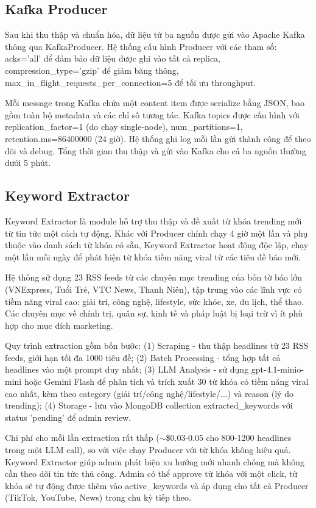 \subsection{Kafka Producer}

Sau khi thu thập và chuẩn hóa, dữ liệu từ ba nguồn được gửi vào Apache Kafka thông qua KafkaProducer. Hệ thống cấu hình Producer với các tham số: acks='all' để đảm bảo dữ liệu được ghi vào tất cả replica, compression\_type='gzip' để giảm băng thông, max\_in\_flight\_requests\_per\_connection=5 để tối ưu throughput.

Mỗi message trong Kafka chứa một content item được serialize bằng JSON, bao gồm toàn bộ metadata và các chỉ số tương tác. Kafka topics được cấu hình với replication\_factor=1 (do chạy single-node), num\_partitions=1, retention.ms=86400000 (24 giờ). Hệ thống ghi log mỗi lần gửi thành công để theo dõi và debug. Tổng thời gian thu thập và gửi vào Kafka cho cả ba nguồn thường dưới 5 phút.

\subsection{Keyword Extractor}

Keyword Extractor là module hỗ trợ thu thập và đề xuất từ khóa trending mới từ tin tức một cách tự động. Khác với Producer chính chạy 4 giờ một lần và phụ thuộc vào danh sách từ khóa có sẵn, Keyword Extractor hoạt động độc lập, chạy một lần mỗi ngày để phát hiện từ khóa tiềm năng viral từ các tiêu đề báo mới.

Hệ thống sử dụng 23 RSS feeds từ các chuyên mục trending của bốn tờ báo lớn (VNExpress, Tuổi Trẻ, VTC News, Thanh Niên), tập trung vào các lĩnh vực có tiềm năng viral cao: giải trí, công nghệ, lifestyle, sức khỏe, xe, du lịch, thể thao. Các chuyên mục về chính trị, quân sự, kinh tế và pháp luật bị loại trừ vì ít phù hợp cho mục đích marketing.

Quy trình extraction gồm bốn bước: (1) Scraping - thu thập headlines từ 23 RSS feeds, giới hạn tối đa 1000 tiêu đề; (2) Batch Processing - tổng hợp tất cả headlines vào một prompt duy nhất; (3) LLM Analysis - sử dụng gpt-4.1-minio-mini hoặc Gemini Flash để phân tích và trích xuất 30 từ khóa có tiềm năng viral cao nhất, kèm theo category (giải trí/công nghệ/lifestyle/...) và reason (lý do trending); (4) Storage - lưu vào MongoDB collection extracted\_keywords với status 'pending' để admin review.

Chi phí cho mỗi lần extraction rất thấp ($\sim$\$0.03-0.05 cho 800-1200 headlines trong một LLM call), so với việc chạy Producer với từ khóa không hiệu quả. Keyword Extractor giúp admin phát hiện xu hướng mới nhanh chóng mà không cần theo dõi tin tức thủ công. Admin có thể approve từ khóa với một click, từ khóa sẽ tự động được thêm vào active\_keywords và áp dụng cho tất cả Producer (TikTok, YouTube, News) trong chu kỳ tiếp theo.

